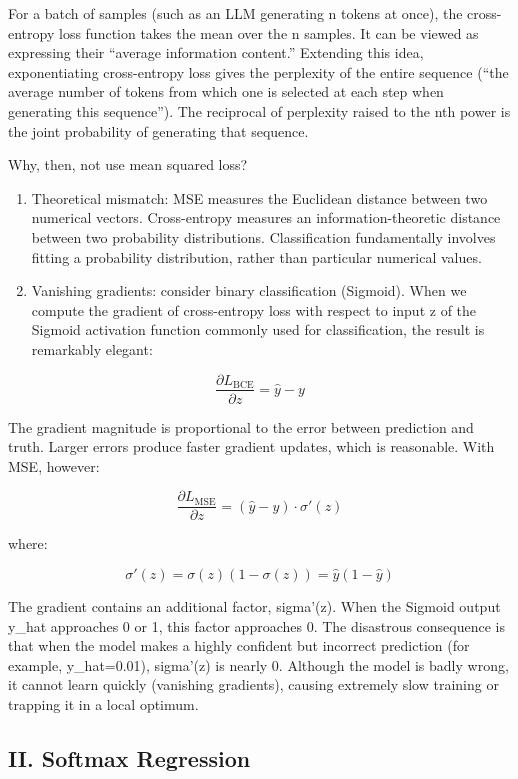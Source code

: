For a batch of samples (such as an LLM generating n tokens at once), the cross-entropy loss function takes the mean over the n samples. It can be viewed as expressing their ``average information content.'' Extending this idea, exponentiating cross-entropy loss gives the perplexity of the entire sequence (``the average number of tokens from which one is selected at each step when generating this sequence''). The reciprocal of perplexity raised to the nth power is the joint probability of generating that sequence.

Why, then, not use mean squared loss?

\begin{enumerate}
\def\labelenumi{\arabic{enumi}.}
\item
  Theoretical mismatch: MSE measures the Euclidean distance between two numerical vectors. Cross-entropy measures an information-theoretic distance between two probability distributions. Classification fundamentally involves fitting a probability distribution, rather than particular numerical values.
\item
  Vanishing gradients: consider binary classification (Sigmoid). When we compute the gradient of cross-entropy loss with respect to input z of the Sigmoid activation function commonly used for classification, the result is remarkably elegant:
\end{enumerate}

\[
\frac{\partial L_{\mathrm{BCE}}}{\partial z}=\hat{y}-y
\]

The gradient magnitude is proportional to the error between prediction and truth. Larger errors produce faster gradient updates, which is reasonable. With MSE, however:

\[
\frac{\partial L_{\mathrm{MSE}}}{\partial z}=(\hat{y}-y)\cdot\sigma'(z)
\]

where:

\[
\sigma'(z)=\sigma(z)(1-\sigma(z))=\hat{y}(1-\hat{y})
\]

The gradient contains an additional factor, sigma'(z). When the Sigmoid output y\_hat approaches 0 or 1, this factor approaches 0. The disastrous consequence is that when the model makes a highly confident but incorrect prediction (for example, y\_hat=0.01), sigma'(z) is nearly 0. Although the model is badly wrong, it cannot learn quickly (vanishing gradients), causing extremely slow training or trapping it in a local optimum.

\hypertarget{ii.-softmax-regression}{%
\subsection{II. Softmax Regression}\label{ii.-softmax-regression}}

